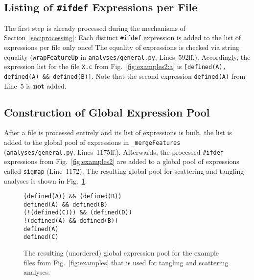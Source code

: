 \documentclass[a4paper]{scrartcl}
\newcommand\sub[1]{\textsubscript{#1}}
\newcommand\code[1]{\texttt{#1}}
\newcommand\feature[1]{\texttt{#1}}
\newcommand\metric[1]{{#1}}
\newcommand\ifdeff[1]{\code{\##1}\xspace}
\newcommand\ifdef[0]{{\upshape\ifdeff{ifdef}}\xspace}
\begin{document}
\subsection{Listing of \ifdef Expressions per File}

The first step is already processed during the mechanisms of Section~\ref{sec:processing}:
Each distinct \ifdef expression is added to the list of expressions per file only once!
The equality of expressions is checked via string equality (\code{wrapFeatureUp} in \code{analyses/general.py}, Lines~592ff.).
Accordingly, the expression list for the file \code{X.c} from Fig.\ \ref{fig:examples2:a} is \feature{[defined(A), defined(A) \&\& defined(B)]}.
Note that the second expression \feature{defined(A)} from Line~5 is \textbf{not} added.


\subsection{Construction of Global Expression Pool}

After a file is processed entirely and its list of expressions is built, the list is added to the global pool of expressions in \code{\_mergeFeatures} (\code{analyses/general.py}, Lines~1175ff.).
Afterwards, the processed \ifdef expressions from Fig.\ \ref{fig:examples2} are added to a global pool of expressions called \code{sigmap} (Line~1172).
The resulting global pool for scattering and tangling analyses is shown in Fig.\ \ref{fig:pool}.

\begin{figure}
\begin{lstlisting}
(defined(A)) && (defined(B))
defined(A) && defined(B)
(!(defined(C))) && (defined(D))
!(defined(A) && defined(B))
defined(A)
defined(C)
\end{lstlisting}
\caption{The resulting (unordered) global expression pool for the example files from Fig.\ \ref*{fig:examples} that is used for tangling and scattering analyses.}
\label{fig:pool}
\end{figure}


%
%



\end{document}

